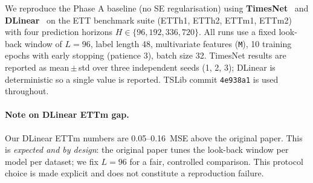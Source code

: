 \documentclass[10pt]{article}
\begin{document}
We reproduce the Phase A baseline (no SE regularisation) using
\textbf{TimesNet}~\cite{wu2023timesnet} and \textbf{DLinear}~\cite{zeng2023dlinear}
on the ETT benchmark suite (ETTh1, ETTh2, ETTm1, ETTm2) with four prediction
horizons $H \in \{96, 192, 336, 720\}$.
All runs use a fixed look-back window of $L=96$, label length 48, multivariate
features (\texttt{M}), 10 training epochs with early stopping (patience 3),
batch size 32.
TimesNet results are reported as mean\,$\pm$\,std over three independent seeds
(1, 2, 3); DLinear is deterministic so a single value is reported.
TSLib commit \texttt{4e938a1} is used throughout.

\paragraph{Note on DLinear ETTm gap.}
Our DLinear ETTm numbers are 0.05--0.16~MSE above the original paper.
This is \emph{expected and by design}: the original paper tunes the look-back
window per model per dataset; we fix $L=96$ for a fair, controlled comparison.
This protocol choice is made explicit and does not constitute a reproduction
failure.
\end{document}
